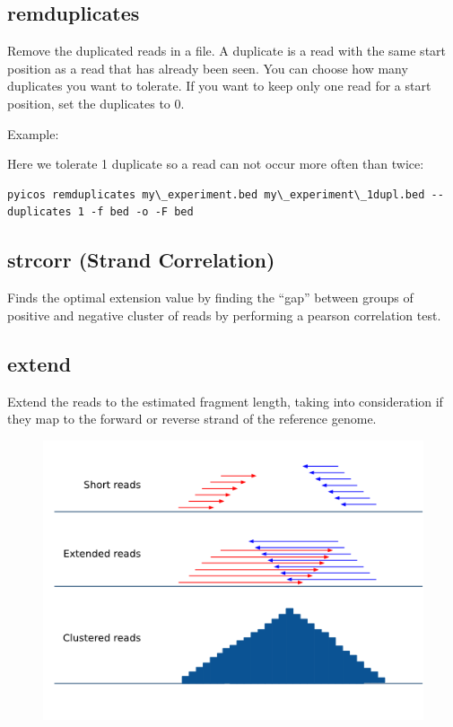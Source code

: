 \documentclass[letterpaper,10pt,english]{sphinxmanual}
\begin{document}
\subsection{remduplicates}
\label{pyicos:remduplicates}
Remove the duplicated reads in a file. A duplicate is a read with the same start position as a read that has already been seen. You can choose how many duplicates you want to tolerate. If you want to keep only one read for a start position, set the duplicates to 0.

Example:

Here we tolerate 1 duplicate so a read can not occur more often than twice:

\begin{Verbatim}[commandchars=\\\{\}]
pyicos remduplicates my\_experiment.bed my\_experiment\_1dupl.bed --duplicates 1 -f bed -o -F bed
\end{Verbatim}


\subsection{strcorr (Strand Correlation)}
\label{pyicos:strcorr-strand-correlation}
Finds the optimal extension value by finding the ``gap'' between groups of positive and negative cluster of reads by performing a pearson correlation test.


\subsection{extend}
\label{pyicos:extend}
Extend the reads to the estimated fragment length, taking into consideration if they map to the forward or reverse strand of the reference genome.
\begin{figure}[htbp]
\centering

\includegraphics{Extend.png}
\end{figure}
\end{document}
